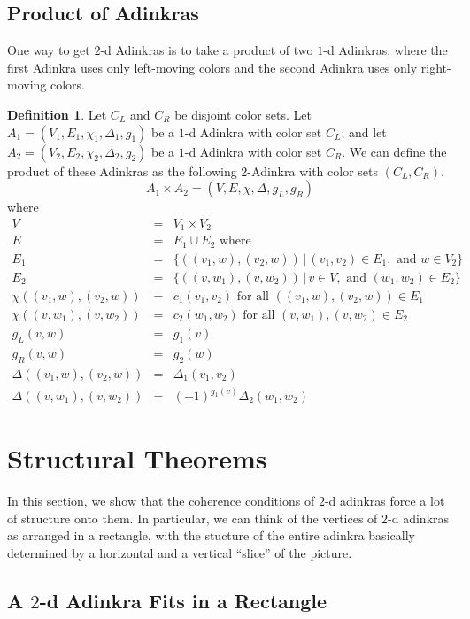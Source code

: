 \documentclass[12pt,twoside,singlespace]{article}
\numberwithin{equation}{section}
\theoremstyle{definition}
\newtheorem{definition}[equation]{Definition}
\begin{document}
\subsection{Product of Adinkras}
One way to get $2$-d Adinkras is to take a product of two $1$-d Adinkras, where the first Adinkra uses only left-moving colors and the second Adinkra uses only right-moving colors.

\begin{definition}
Let $C_L$ and $C_R$ be disjoint color sets.  Let $A_1=(V_1, E_1, \chi_1, \Delta_1,g_1)$ be a $1$-d Adinkra with color set $C_L$; and let $A_2=(V_2, E_2, \chi_2, \Delta_2,g_2)$ be a $1$-d Adinkra with color set $C_R$.  We can define the product of these Adinkras as the following 2-Adinkra with color sets $(C_L,C_R)$.
\[A_1\times A_2=(V,E,\chi,\Delta,g_L,g_R)\]
where
\begin{eqnarray*}
V&=&V_1\times V_2\\
E&=&E_1\cup E_2\mbox{ where}\\
E_1&=&\{((v_1,w),(v_2,w))\,|\,(v_1, v_2)\in E_1,\mbox{ and } w\in V_2\}\\
E_2&=&\{((v,w_1),(v,w_2))\,|\,v\in V, \mbox{ and }(w_1,w_2)\in E_2\}\\
\chi((v_1,w),(v_2,w))&=&c_1(v_1,v_2)\mbox{ for all $((v_1,w),(v_2,w))\in E_1$}\\
\chi((v,w_1),(v,w_2))&=&c_2(w_1,w_2)\mbox{ for all $(v,w_1),(v,w_2)\in E_2$}\\
g_L(v,w)&=&g_1(v)\\
g_R(v,w)&=&g_2(w)\\
\Delta((v_1,w),(v_2,w))&=&\Delta_1(v_1,v_2)\\
\Delta((v,w_1),(v,w_2))&=&(-1)^{g_1(v)}\Delta_2(w_1,w_2)
\end{eqnarray*}
\end{definition}


\section{Structural Theorems}

In this section, we show that the coherence conditions of $2$-d adinkras force a lot of structure onto them. In particular, we can think of the vertices of $2$-d adinkras as arranged in a rectangle, with the stucture of the entire adinkra basically determined by a horizontal and a vertical ``slice'' of the picture.

\subsection{A $2$-d Adinkra Fits in a Rectangle}
\end{document}
